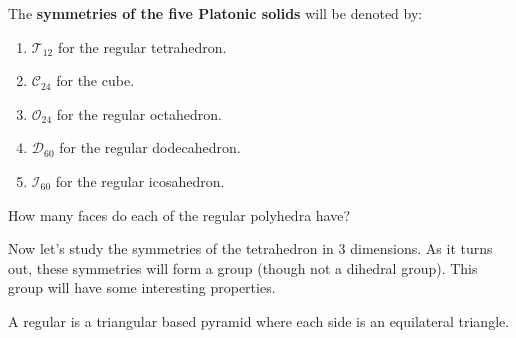 \documentclass{ximera}
\begin{document}
\begin{definition}
  The \textbf{symmetries of the five Platonic solids} will be denoted
  by:
  \begin{enumerate}
  \item $\mathcal{T}_{12}$ for the regular tetrahedron.
  \item $\mathcal{C}_{24}$ for the cube.
  \item $\mathcal{O}_{24}$ for the regular octahedron.
  \item $\mathcal{D}_{60}$ for the regular dodecahedron.
  \item $\mathcal{I}_{60}$ for the regular icosahedron.
  \end{enumerate}
\end{definition}

\begin{exercise}
  How many faces do each of the regular polyhedra have?
\end{exercise}


Now let's study the symmetries of the tetrahedron in $3$ dimensions.
As it turns out, these symmetries will form a group (though not a
dihedral group). This group will have some interesting properties.


A regular  is a triangular based pyramid where each
side is an equilateral triangle.
\end{document}
